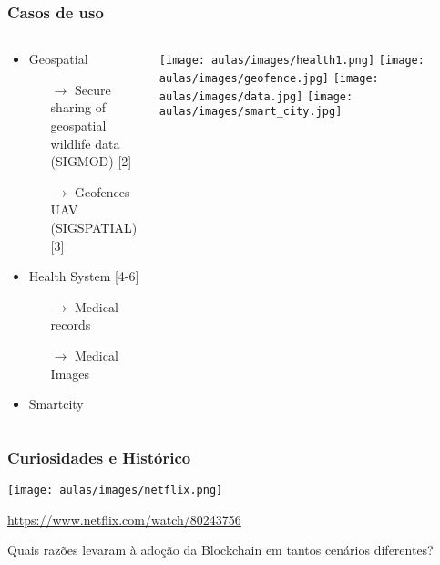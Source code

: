 \documentclass{beamer}
\begin{document}
\begin{frame}
\frametitle{Casos de uso}
\begin{columns}[T]
\begin{column}{0.7\textwidth}
\begin{itemize}
 \item Geospatial
        \begin{itemize}
            \item [$\rightarrow$] Secure sharing of geospatial wildlife data (SIGMOD) [2]
            \item [$\rightarrow$] Geofences UAV (SIGSPATIAL) [3]
        \end{itemize}
        \item Health System [4-6]
        \begin{itemize}
          \item [$\rightarrow$] Medical records
          \item [$\rightarrow$] Medical Images
        \end{itemize}
        \item Smartcity
\end{itemize}
\end{column}
  \begin{column}{0.25\textwidth}
        \texttt{[image: aulas/images/health1.png]}
        \vspace*{0.2cm}
        \texttt{[image: aulas/images/geofence.jpg]}
         \vspace*{0.2cm}
        \texttt{[image: aulas/images/data.jpg]}
        \vspace*{0.2cm}
        \texttt{[image: aulas/images/smart\_city.jpg]}
    \end{column}
\end{columns}
\end{frame}



\begin{frame}
\frametitle{Curiosidades e Histórico}
\begin{center}
\texttt{[image: aulas/images/netflix.png]}

\href{https://www.netflix.com/watch/80243756}{https://www.netflix.com/watch/80243756}
\end{center}

\end{frame}

\begin{frame}
 \begin{center}
        \Large Quais razões levaram à adoção da Blockchain em tantos cenários diferentes?
    \end{center}
\end{frame}
\end{document}
